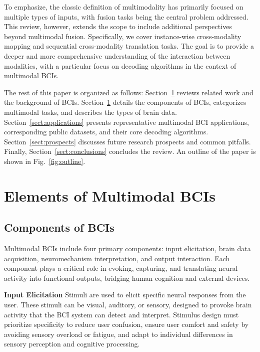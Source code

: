 \documentclass[journal]{IEEEtran}
\begin{document}
To emphasize, the classic definition of multimodality has primarily focused on multiple types of inputs, with fusion tasks being the central problem addressed. This review, however, extends the scope to include additional perspectives beyond multimodal fusion. Specifically, we cover instance-wise cross-modality mapping and sequential cross-modality translation tasks. The goal is to provide a deeper and more comprehensive understanding of the interaction between modalities, with a particular focus on decoding algorithms in the context of multimodal BCIs.

The rest of this paper is organized as follows: Section~\ref{sect:background} reviews related work and the background of BCIs. Section~\ref{sect:background} details the components of BCIs, categorizes multimodal tasks, and describes the types of brain data. Section~\ref{sect:applications} presents representative multimodal BCI applications, corresponding public datasets, and their core decoding algorithms. Section~\ref{sect:prospects} discusses future research prospects and common pitfalls. Finally, Section~\ref{sect:conclusions} concludes the review. An outline of the paper is shown in Fig.~\ref{fig:outline}.

\section{Elements of Multimodal BCIs} \label{sect:background}

\subsection{Components of BCIs} \label{sect:bcicomponents}

Multimodal BCIs include four primary components: input elicitation, brain data acquisition, neuromechanism interpretation, and output interaction. Each component plays a critical role in evoking, capturing, and translating neural activity into functional outputs, bridging human cognition and external devices.

\textbf{Input Elicitation} Stimuli are used to elicit specific neural responses from the user. These stimuli can be visual, auditory, or sensory, designed to provoke brain activity that the BCI system can detect and interpret. Stimulus design must prioritize specificity to reduce user confusion, ensure user comfort and safety by avoiding sensory overload or fatigue, and adapt to individual differences in sensory perception and cognitive processing.
\end{document}
